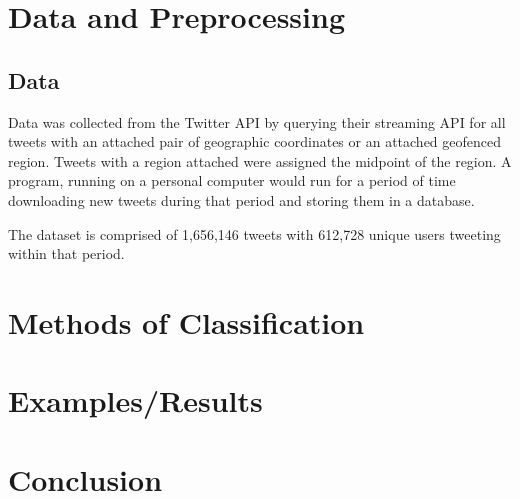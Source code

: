 \documentclass[midd]{thesis}
\begin{document}
\chapter{Data and Preprocessing}
\section{Data}

Data was collected from the Twitter API by querying their streaming API for all tweets with an attached pair of geographic coordinates or an attached geofenced region. Tweets with a region attached were assigned the midpoint of the region. A program, running on a personal computer would run for a period of time downloading new tweets during that period and storing them in a database. 

The dataset is comprised of 1,656,146 tweets with 612,728 unique users tweeting within that period.


\chapter{Methods of Classification}

\chapter{Examples/Results}

\chapter{Conclusion}


\appendix
\nocite{*}


\end{document}
